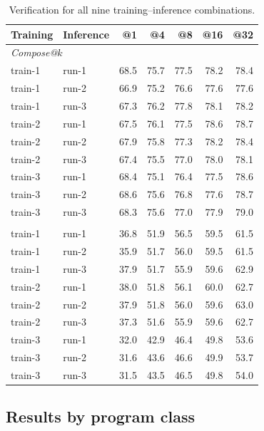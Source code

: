 \documentclass[10pt]{article}
\begin{document}
\begin{table}[H]
\centering
\begin{tabular}{llrrrrr}
\toprule
\rowcolor{headerbg}
Training & Inference & @1 & @4 & @8 & @16 & @32 \\
\midrule
\multicolumn{7}{l}{\textit{Compose@\(k\)}} \\
train-1 & run-1 & 68.5 & 75.7 & 77.5 & 78.2 & 78.4 \\
train-1 & run-2 & 66.9 & 75.2 & 76.6 & 77.6 & 77.6 \\
train-1 & run-3 & 67.3 & 76.2 & 77.8 & 78.1 & 78.2 \\
train-2 & run-1 & 67.5 & 76.1 & 77.5 & 78.6 & 78.7 \\
train-2 & run-2 & 67.9 & 75.8 & 77.3 & 78.2 & 78.4 \\
train-2 & run-3 & 67.4 & 75.5 & 77.0 & 78.0 & 78.1 \\
train-3 & run-1 & 68.4 & 75.1 & 76.4 & 77.5 & 78.6 \\
train-3 & run-2 & 68.6 & 75.6 & 76.8 & 77.6 & 78.7 \\
train-3 & run-3 & 68.3 & 75.6 & 77.0 & 77.9 & 79.0 \\
\addlinespace
\multicolumn{7}{l}{\textit{Pass@\(k\)}} \\
train-1 & run-1 & 36.8 & 51.9 & 56.5 & 59.5 & 61.5 \\
train-1 & run-2 & 35.9 & 51.7 & 56.0 & 59.5 & 61.5 \\
train-1 & run-3 & 37.9 & 51.7 & 55.9 & 59.6 & 62.9 \\
train-2 & run-1 & 38.0 & 51.8 & 56.1 & 60.0 & 62.7 \\
train-2 & run-2 & 37.9 & 51.8 & 56.0 & 59.6 & 63.0 \\
train-2 & run-3 & 37.3 & 51.6 & 55.9 & 59.6 & 62.7 \\
train-3 & run-1 & 32.0 & 42.9 & 46.4 & 49.8 & 53.6 \\
train-3 & run-2 & 31.6 & 43.6 & 46.6 & 49.9 & 53.7 \\
train-3 & run-3 & 31.5 & 43.5 & 46.5 & 49.8 & 54.0 \\
\bottomrule
\end{tabular}
\caption{Verification for all nine training--inference combinations.}
\label{tab:repeat-individual}
\end{table}

\clearpage
\subsection{Results by program class}
\end{document}

